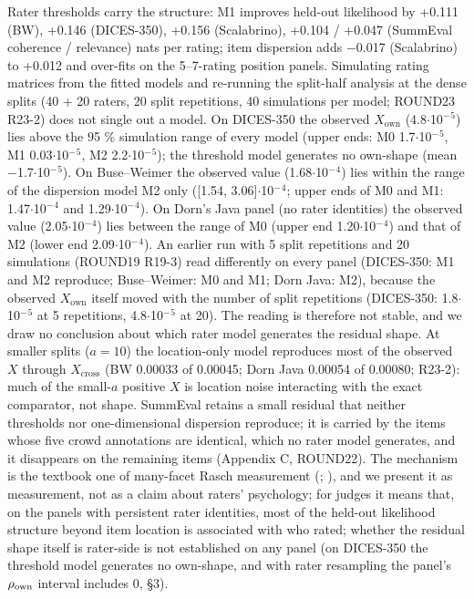 \documentclass[10pt,twocolumn]{article}
\begin{document}
Rater thresholds carry the structure: M1 improves held-out likelihood by +0.111 (BW), +0.146 (DICES-350), +0.156 (Scalabrino), +0.104 / +0.047 (SummEval coherence / relevance) nats per rating; item dispersion adds $-$0.017 (Scalabrino) to +0.012 and over-fits on the 5--7-rating position panels. Simulating rating matrices from the fitted models and re-running the split-half analysis at the dense splits (40 + 20 raters, 20 split repetitions, 40 simulations per model; ROUND23 R23-2) does not single out a model. On DICES-350 the observed \(X_{\text{own}}\) (4.8$\cdot$10$^{-}$$^{5}$) lies above the 95 \% simulation range of every model (upper ends: M0 1.7$\cdot$10$^{-}$$^{5}$, M1 0.03$\cdot$10$^{-}$$^{5}$, M2 2.2$\cdot$10$^{-}$$^{5}$); the threshold model generates no own-shape (mean $-$1.7$\cdot$10$^{-}$$^{5}$). On Buse--Weimer the observed value (1.68$\cdot$10$^{-}$$^{4}$) lies within the range of the dispersion model M2 only ({[}1.54, 3.06{]}$\cdot$10$^{-}$$^{4}$; upper ends of M0 and M1: 1.47$\cdot$10$^{-}$$^{4}$ and 1.29$\cdot$10$^{-}$$^{4}$). On Dorn's Java panel (no rater identities) the observed value (2.05$\cdot$10$^{-}$$^{4}$) lies between the range of M0 (upper end 1.20$\cdot$10$^{-}$$^{4}$) and that of M2 (lower end 2.09$\cdot$10$^{-}$$^{4}$). An earlier run with 5 split repetitions and 20 simulations (ROUND19 R19-3) read differently on every panel (DICES-350: M1 and M2 reproduce; Buse--Weimer: M0 and M1; Dorn Java: M2), because the observed \(X_{\text{own}}\) itself moved with the number of split repetitions (DICES-350: 1.8$\cdot$10$^{-}$$^{5}$ at 5 repetitions, 4.8$\cdot$10$^{-}$$^{5}$ at 20). The reading is therefore not stable, and we draw no conclusion about which rater model generates the residual shape. At smaller splits (\(a=10\)) the location-only model reproduces most of the observed \(X\) through \(X_{\text{cross}}\) (BW 0.00033 of 0.00045; Dorn Java 0.00054 of 0.00080; R23-2): much of the small-\(a\) positive \(X\) is location noise interacting with the exact comparator, not shape. SummEval retains a small residual that neither thresholds nor one-dimensional dispersion reproduce; it is carried by the items whose five crowd annotations are identical, which no rater model generates, and it disappears on the remaining items (Appendix C, ROUND22). The mechanism is the textbook one of many-facet Rasch measurement (\citealp{linacre1989mfrm}; \citealp{eckes2011mfrm}), and we present it as measurement, not as a claim about raters' psychology; for judges it means that, on the panels with persistent rater identities, most of the held-out likelihood structure beyond item location is associated with who rated; whether the residual shape itself is rater-side is not established on any panel (on DICES-350 the threshold model generates no own-shape, and with rater resampling the panel's \(\rho_{\rm own}\) interval includes 0, \S{}3).
\end{document}

